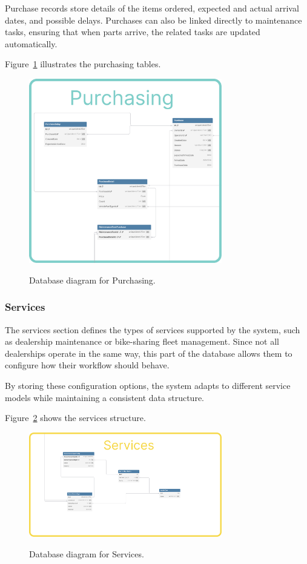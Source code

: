 Purchase records store details of the items ordered, expected and actual arrival dates, and possible delays. Purchases can also be linked directly to maintenance tasks, ensuring that when parts arrive, the related tasks are updated automatically.

Figure~\ref{fig:dbPurchasing} illustrates the purchasing tables.

\begin{figure}[h]
  \caption{Database diagram for Purchasing.}
  \centering
  \includegraphics[width=0.75\textwidth]{figs/dbDiagrams/Purchasing}
  \label{fig:dbPurchasing}
\end{figure}


\subsubsection{Services} 

The services section defines the types of services supported by the system, such as dealership maintenance or bike-sharing fleet management. Since not all dealerships operate in the same way, this part of the database allows them to configure how their workflow should behave.

By storing these configuration options, the system adapts to different service models while maintaining a consistent data structure.

Figure~\ref{fig:dbServices} shows the services structure.

\begin{figure}[h]
  \caption{Database diagram for Services.}
  \centering
  \includegraphics[width=0.75\textwidth]{figs/dbDiagrams/Services}
  \label{fig:dbServices}
\end{figure}


